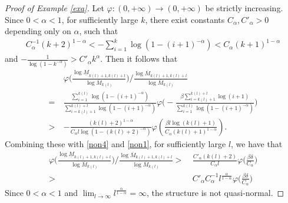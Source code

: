 \documentclass[12pt]{amsart}
\numberwithin{equation}{section}
\theoremstyle{plain}
\theoremstyle{remark}
\theoremstyle{definition}
\newcommand{\om}{\overline{M}}
\newcommand{\um}{\underline{M}}
\newcommand{\de}{\delta}
\newcommand{\f}{\frac}
\renewcommand{\ge}{\geqslant}
\newcommand{\blue}[1]{{\color{blue}#1}}
\begin{document}
\begin{proof}[Proof of Example \ref{exa}]

		
		Let $\varphi:(0,+\infty)\to (0,+\infty)$ be strictly increasing.   
		Since $0<\alpha<1$, for sufficiently large $k$, there exist   constants $C_\alpha,C'_\alpha>0$ depending only on $\alpha$, such that
		\begin{align*} 
			C_\alpha^{-1}(k+2)^{1-\alpha}<-\sum_{i=1}^k \log (1-(i+1)^{-\alpha})<C_\alpha(k+1)^{1-\alpha}
		\end{align*}
		and $	-\f1{\log(1-k^{-\alpha})}>C'_\alpha k^\alpha. $  Then it follows that  
		\begin{align*}
			&\varphi\Big(\frac{\log \um_{k(l)+1,k(l)+l}}{\log \om_{k(l)}}\Big)\bigg/\frac{\log \om_{k(l)+1,k(l)+l}}{\log \om_{k(l)}}\\
			=\ &\frac{\sum_{i=1}^{k(l)}\log (1-(i+1)^{-\alpha})}{\sum_{i=k(l)+1}^{k(l)+l} \log(1-(i+1)^{-\alpha})}\varphi\Big(-\frac{\beta\sum_{i=k(l)+1}^{k(l)+l}\log (i+1)}{\sum_{i=1}^{k(l)} \log(1-(i+1)^{-\alpha})}\Big)\\
			>\ &    -\f{ (k(l)+2)^{1-\alpha}}{C_{\alpha}l\log(1-(k(l)+2)^{-\alpha})}\varphi\left(\frac{\beta l\log (k(l)+1)}{C_{\alpha} (k(l)+1)^{1-\alpha}}\right)          .
		\end{align*}
		Combining these  with   \eqref{non4} and \eqref{non1}, for sufficiently large $l$,  we have that
		\begin{align*}
			\varphi\Big(\frac{\log \um_{k(l)+1,k(l)+l}}{\log \om_{k(l)}}\Big)\bigg/\frac{\log \om_{k(l)+1,k(l)+l}}{\log \om_{k(l)}}>\ &\f{C'_\alpha(k(l)+2)}{C_\alpha l}\varphi\Big(\frac{\beta\de}{C_\alpha}\Big)\\
			>\ & C'_\alpha C_\alpha^{-1}l^{\f{\alpha}{1-\alpha}}\varphi\Big(\frac{\beta\de}{C_\alpha}\Big) 
		\end{align*}
		Since $0<\alpha<1$ and  $\lim_{l\to\infty}l^{\f{\alpha}{1-\alpha}}=\infty$, the structure is not quasi-normal.
		

\end{proof}
\end{document}
